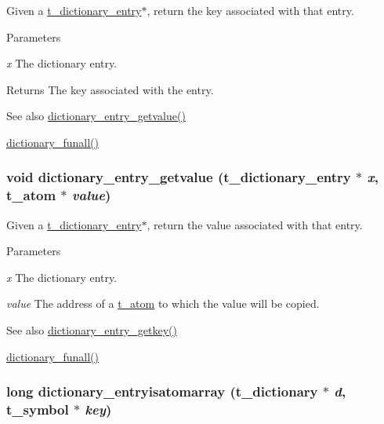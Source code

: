 Given a \hyperlink{structt__dictionary__entry}{t\_\-dictionary\_\-entry}$\ast$, return the key associated with that entry. 
\begin{DoxyParams}{Parameters}
\item[{\em x}]The dictionary entry. \end{DoxyParams}
\begin{DoxyReturn}{Returns}
The key associated with the entry.
\end{DoxyReturn}
\begin{DoxySeeAlso}{See also}
\hyperlink{group__dictionary_ga55877f4d0fef0a8d0badf9afc95bb7d0}{dictionary\_\-entry\_\-getvalue()} 

\hyperlink{group__dictionary_ga923b67932c8401f58dee86cfb3bb5110}{dictionary\_\-funall()} 
\end{DoxySeeAlso}
\hypertarget{group__dictionary_ga55877f4d0fef0a8d0badf9afc95bb7d0}{
\subsubsection[{dictionary\_\-entry\_\-getvalue}]{\setlength{\rightskip}{0pt plus 5cm}void dictionary\_\-entry\_\-getvalue ({\bf t\_\-dictionary\_\-entry} $\ast$ {\em x}, \/  {\bf t\_\-atom} $\ast$ {\em value})}}
\label{group__dictionary_ga55877f4d0fef0a8d0badf9afc95bb7d0}


Given a \hyperlink{structt__dictionary__entry}{t\_\-dictionary\_\-entry}$\ast$, return the value associated with that entry. 
\begin{DoxyParams}{Parameters}
\item[{\em x}]The dictionary entry. \item[{\em value}]The address of a \hyperlink{structt__atom}{t\_\-atom} to which the value will be copied.\end{DoxyParams}
\begin{DoxySeeAlso}{See also}
\hyperlink{group__dictionary_ga866aeb04d26740768790f64203f30b7c}{dictionary\_\-entry\_\-getkey()} 

\hyperlink{group__dictionary_ga923b67932c8401f58dee86cfb3bb5110}{dictionary\_\-funall()} 
\end{DoxySeeAlso}
\hypertarget{group__dictionary_ga7657d5e84298475261088dbce18d70d9}{
\subsubsection[{dictionary\_\-entryisatomarray}]{\setlength{\rightskip}{0pt plus 5cm}long dictionary\_\-entryisatomarray ({\bf t\_\-dictionary} $\ast$ {\em d}, \/  {\bf t\_\-symbol} $\ast$ {\em key})}}
\label{group__dictionary_ga7657d5e84298475261088dbce18d70d9}


